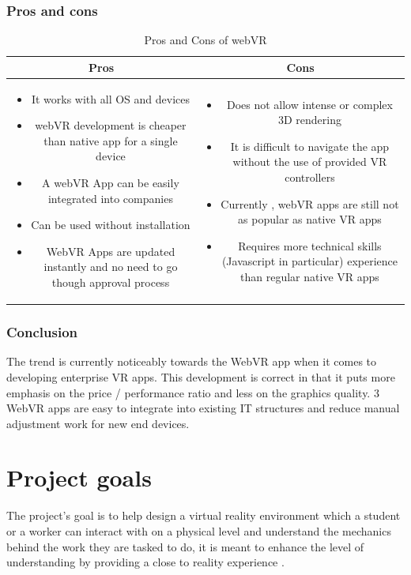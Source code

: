 \documentclass[]{report}
\begin{document}
\subsubsection{Pros and cons}
\begin{table}[H]
	
 \begin{tabular}{|c| c|}
 	
	\hline
	\rowcolor[HTML]{6600ff}  \color{white}Pros & \color{white}Cons\\\hline
	\parbox{.45\textwidth}{\begin{itemize}
			\item It works with all OS and devices
			\item webVR development is cheaper
			than native app for a single device
			\item A webVR App can be easily
			integrated into companies
			\item Can be used without installation
			\item WebVR Apps are updated instantly
			and no need to go though approval
			process
	\end{itemize}} & \parbox{.45\textwidth}{\begin{itemize}
			\item Does not allow intense or
			complex 3D rendering
			\item It is difficult to navigate the app
			without the use of provided VR
			controllers
			\item Currently , webVR apps are still
			not as popular as native VR apps
			\item Requires more technical skills
			(Javascript in particular) experience
			than regular native VR apps
	\end{itemize}}\\\bottomrule
\end{tabular}
\caption[Pros and Cons of webVR]{Pros and Cons of webVR}
\end{table}
\subsubsection{Conclusion}
The trend is currently noticeably towards the WebVR app when it comes to
developing enterprise VR apps. This development is correct in that it puts more
emphasis on the price / performance ratio and less on the graphics quality.
3
WebVR apps are easy to integrate into existing IT structures and reduce manual
adjustment work for new end devices.

\section{Project goals}
The project’s goal is to help design a virtual reality environment which a
student or a worker can interact with on a physical level and understand the
mechanics behind the work they are tasked to do, it is meant to enhance the
level of understanding by providing a close to reality experience .
\end{document}
